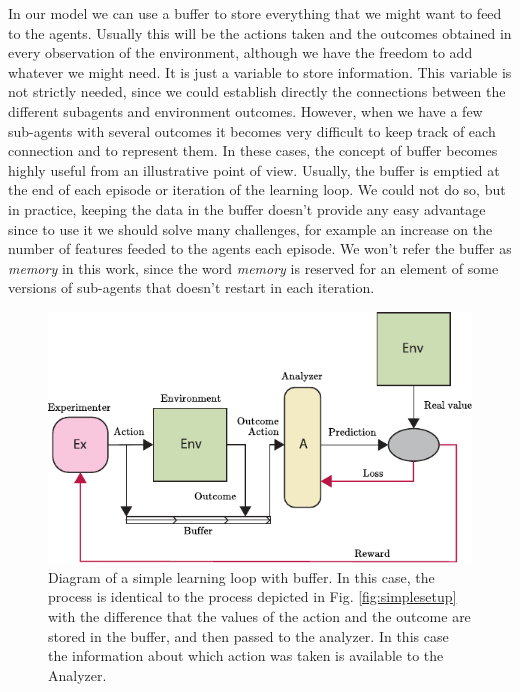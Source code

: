 \documentclass[11pt,a4paper,twoside]{report}
\newcommand{\+}{\textnormal{+} }
\theoremstyle{definition}
\numberwithin{equation}{chapter}
\begin{document}
In our model we can use a buffer to store everything that we might want to feed
to the agents. Usually this will be the actions taken and the outcomes obtained
in every observation of the environment, although we have the freedom to add
whatever we might need. It is just a variable to store information. This
variable is not strictly needed, since we could establish directly the
connections between the different subagents and environment outcomes. However,
when we have a few sub-agents with several outcomes it becomes very difficult to
keep track of each connection and to represent them. In these cases, the concept
of buffer becomes highly useful from an illustrative point of view. Usually, the
buffer is emptied at the end of each episode or iteration of the learning loop.
We could not do so, but in practice, keeping the data in the buffer doesn't
provide any easy advantage since to use it we should solve many challenges, for
example an increase on the number of features feeded to the agents each episode.
We won't refer the buffer as \textit{memory} in this work, since the word
\textit{memory} is reserved for an element of some versions of sub-agents that
doesn't restart in each iteration. 


\begin{figure}
  \centering
  \includegraphics{figures/SimpleSetUp(Buffer).pdf}
  \caption{Diagram of a simple learning loop with buffer. In this case, the
  process is identical to the process depicted in Fig. \ref{fig:simplesetup}
  with the difference that the values of the action and the outcome are stored
  in the buffer, and then passed to the analyzer. In this case the information
  about which action was taken is available to the Analyzer.} 
  \label{fig:simplesetupbuffer}
\end{figure}
\end{document}

